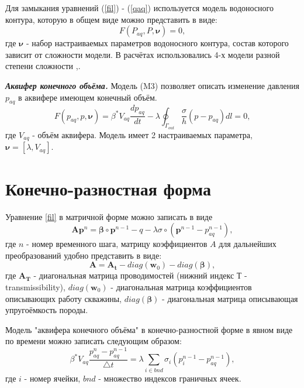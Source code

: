 \documentclass[14pt]{article}
\begin{document}
Для замыкания уравнений (\ref{fil}) - (\ref{qaq}) используется модель водоносного контура, которую в общем виде можно представить в виде: 
\begin{equation} \label{f_aq}
F(P_{aq}, P,\boldsymbol{\nu})=0,
\end{equation}
где $\boldsymbol{\nu}$ - набор настраиваемых параметров водоносного контура, состав которого зависит от сложности модели. В расчётах использовались 4-х модели разной степени сложности \cite{dake},\cite{fet}.

\textbf{\textit{Аквифер конечного объёма.}}
Модель (M3) позволяет описать изменение давления $p_{aq}$ в аквифере имеющем конечный объём. 
\begin{equation}
F(p_{aq}, p,\boldsymbol{\nu})=\beta^*V_{aq}\frac{dp_{aq}}{dt} - \lambda\oint_{\Gamma_{out}}\frac{\sigma}{h}(p-p_{aq})dl = 0,
\end{equation}
где $V_{aq}$ - объём аквифера. Модель имеет 2 настраиваемых параметра, $\boldsymbol{\nu} = [\lambda, V_{aq}]$.

\section{Конечно-разностная форма} 
Уравнение \ref{fil} в матричной форме можно записать в виде
\begin{equation} \label{fil_fin_def}
\boldsymbol{A}\boldsymbol{p}^n = \boldsymbol{\beta}\circ\boldsymbol{p}^{n-1} - q - \lambda\sigma\circ (\boldsymbol{p}^{n-1}-p_{aq}^{n-1}),
\end{equation}
где $ n $ - номер временного шага, матрицу коэффициентов $ A $ для дальнейших преобразований удобно представить в виде:
\begin{equation} \label{adiag}
\boldsymbol{A} = \boldsymbol{A_t} - diag\left(\boldsymbol{w}_0\right) - diag\left(\boldsymbol{\beta}\right),
\end{equation}
где $ \boldsymbol{A_T} $ - диагональная матрица проводимостей (нижний индекс Т -transmissibility), $ diag\left(\boldsymbol{w}_0\right) $ - диагональная матрица коэффициентов описывающих работу скважины, $ diag\left(\boldsymbol{\beta}\right) $ - диагональная матрица описывающая упругоёмкость породы.

Модель "аквифера конечного объёма" в конечно-разностной форме в явном виде по времени можно записать следующим образом: 
\begin{equation} \label{aq_num}
\beta^* V_{aq}\frac{p_{aq}^n - p_{aq}^{n-1}}{\bigtriangleup t} = \lambda\sum_{i \in bnd}\sigma_i(p_i^{n-1}-p_{aq}^{n-1}),
\end{equation}
где $ i $ - номер ячейки, $bnd$ - множество индексов граничных ячеек.
\end{document}
